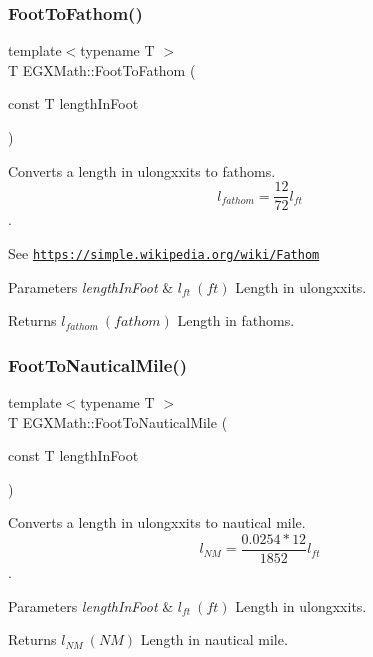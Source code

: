 \subsubsection{\texorpdfstring{Foot\+To\+Fathom()}{FootToFathom()}}
{\footnotesize\ttfamily template$<$typename T $>$ \\
T E\+G\+X\+Math\+::\+Foot\+To\+Fathom (\begin{DoxyParamCaption}\item[{const T}]{length\+In\+Foot }\end{DoxyParamCaption})}



Converts a length in ulongxxits to fathoms. \[ l_{fathom}= \frac{12}{72} l_{ft} \]. 

See \href{https://simple.wikipedia.org/wiki/Fathom}{\tt https\+://simple.\+wikipedia.\+org/wiki/\+Fathom} 
\begin{DoxyParams}{Parameters}
{\em length\+In\+Foot} & $ l_{ft}\ (ft)$ Length in ulongxxits. \\
\hline
\end{DoxyParams}
\begin{DoxyReturn}{Returns}
$ l_{fathom}\ (fathom)$ Length in fathoms. 
\end{DoxyReturn}
\mbox{\label{group___e_g_x_math-_conversions-_length_conversions-_imperial-_foot-_nautical_ga2b73f417fb0e4bcb50bdf79594088a75}} 
\subsubsection{\texorpdfstring{Foot\+To\+Nautical\+Mile()}{FootToNauticalMile()}}
{\footnotesize\ttfamily template$<$typename T $>$ \\
T E\+G\+X\+Math\+::\+Foot\+To\+Nautical\+Mile (\begin{DoxyParamCaption}\item[{const T}]{length\+In\+Foot }\end{DoxyParamCaption})}



Converts a length in ulongxxits to nautical mile. \[ l_{NM}= \frac{0.0254 * 12}{1852} l_{ft} \]. 


\begin{DoxyParams}{Parameters}
{\em length\+In\+Foot} & $ l_{ft}\ (ft)$ Length in ulongxxits. \\
\hline
\end{DoxyParams}
\begin{DoxyReturn}{Returns}
$ l_{NM}\ (NM)$ Length in nautical mile. 
\end{DoxyReturn}
